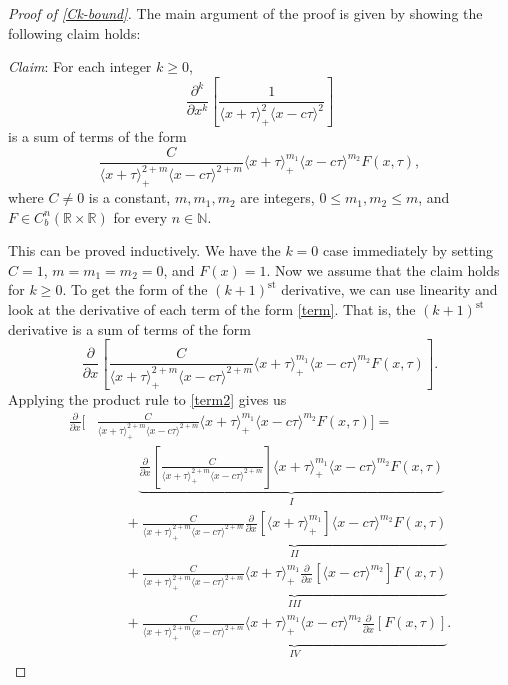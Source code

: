 \documentclass[oneside,reqno]{amsart}
\newcommand{\R}{\mathbb{R}}
\begin{document}
\begin{proof}[Proof of \cref{Ck-bound}]
	The main argument of the proof is given by showing the following claim holds:
	
	\emph{Claim}: For each integer \(k\geq 0\), \[\frac{\partial^k}{\partial x^k} \left[\frac 1 {\langle x+\tau\rangle_+^2 \langle x -c\tau \rangle^2}\right]\] is a sum of terms of the form 
	\begin{equation}\label{term}
		\frac C {\langle x +\tau\rangle_+^{2+m} \langle x -c\tau \rangle^{2+m}}\langle x + \tau \rangle_+^{m_1}\langle x-c\tau\rangle^{m_2} F(x,\tau),
	\end{equation} where \(C\neq 0\) is a constant, \(m,m_1,m_2\) are integers, \(0\leq m_1, m_2 \leq m\), and \(F\in C^n_b(\R\times\R)\) for every \(n\in \mathbb N\).
	
	This can be proved inductively. We have the \(k = 0\) case immediately by setting \(C = 1\), \(m=m_1=m_2 = 0\), and \(F(x) = 1\). Now we assume that the claim holds for \(k\geq 0\). To get the form of the \((k+1)^\text{st}\) derivative, we can use linearity and look at the derivative of each term of the form \cref{term}. That is, the \((k+1)^\text{st}\) derivative is a sum of terms of the form 
	\begin{equation}\label{term2}
		\frac{\partial}{\partial x}\left[\frac C {\langle x +\tau\rangle_+^{2+m} \langle x -c\tau \rangle^{2+m}}\langle x + \tau \rangle_+^{m_1}\langle x-c\tau\rangle^{m_2} F(x,\tau)\right].
	\end{equation}
	Applying the product rule to \cref{term2} gives us 
	\begin{align*}
		\frac{\partial}{\partial x}\Bigg[&\frac C {\langle x +\tau\rangle_+^{2+m} \langle x -c\tau \rangle^{2+m}} \langle x + \tau \rangle_+^{m_1}\langle x-c\tau\rangle^{m_2} F(x,\tau)\Bigg] = \\
		&\qquad\quad \underbrace{\frac{\partial}{\partial x}\left[\frac C {\langle x +\tau\rangle_+^{2+m} \langle x -c\tau \rangle^{2+m}}\right]\langle x + \tau \rangle_+^{m_1}\langle x-c\tau\rangle^{m_2} F(x,\tau)}_{I} \\
		&\qquad+ \underbrace{\frac C {\langle x +\tau\rangle_+^{2+m} \langle x -c\tau \rangle^{2+m}}\frac{\partial}{\partial x}\left[\langle x + \tau \rangle_+^{m_1}\right]\langle x-c\tau\rangle^{m_2} F(x,\tau)}_{II} \\
		&\qquad+ \underbrace{\frac C {\langle x +\tau\rangle_+^{2+m} \langle x -c\tau \rangle^{2+m}}\langle x + \tau \rangle_+^{m_1}\frac{\partial}{\partial x}\left[\langle x-c\tau\rangle^{m_2}\right] F(x,\tau)}_{III} \\
		&\qquad+ \underbrace{\frac C {\langle x +\tau\rangle_+^{2+m} \langle x -c\tau \rangle^{2+m}}\langle x + \tau \rangle_+^{m_1}\langle x-c\tau\rangle^{m_2} \frac{\partial}{\partial x}\left[F(x,\tau)\right] }_{IV}.
	\end{align*}
	

\end{proof}
\end{document}

